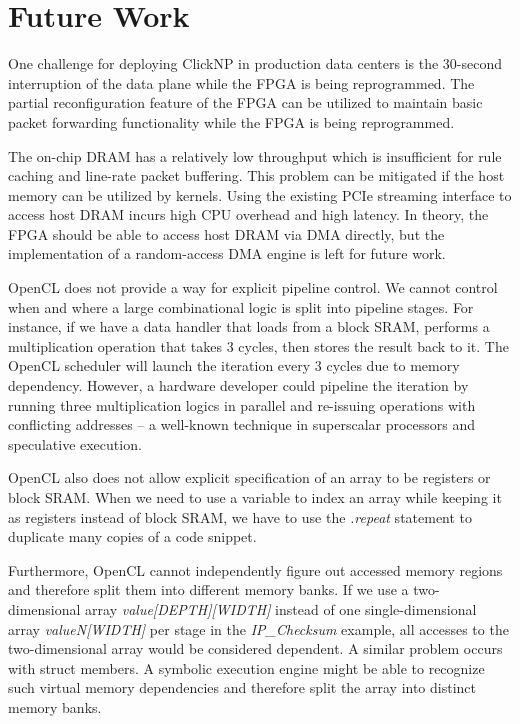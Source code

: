 \section{Future Work}
\label{clicknp:sec:future}

One challenge for deploying ClickNP in production data centers is the 30-second interruption of the data plane while the FPGA is being reprogrammed. The partial reconfiguration \cite{bourgeault2011alteras} feature of the FPGA can be utilized to maintain basic packet forwarding functionality while the FPGA is being reprogrammed.

The on-chip DRAM has a relatively low throughput which is insufficient for rule caching and line-rate packet buffering. This problem can be mitigated if the host memory can be utilized by kernels. Using the existing PCIe streaming interface to access host DRAM incurs high CPU overhead and high latency. In theory, the FPGA should be able to access host DRAM via DMA directly, but the implementation of a random-access DMA engine is left for future work.

OpenCL does not provide a way for explicit pipeline control. We cannot control when and where a large combinational logic is split into pipeline stages. For instance, if we have a data handler that loads from a block SRAM, performs a multiplication operation that takes 3 cycles, then stores the result back to it. The OpenCL scheduler will launch the iteration every 3 cycles due to memory dependency. However, a hardware developer could pipeline the iteration by running three multiplication logics in parallel and re-issuing operations with conflicting addresses -- a well-known technique in superscalar processors and speculative execution.

OpenCL also does not allow explicit specification of an array to be registers or block SRAM. When we need to use a variable to index an array while keeping it as registers instead of block SRAM, we have to use the \textit{.repeat} statement to duplicate many copies of a code snippet.

Furthermore, OpenCL cannot independently figure out accessed memory regions and therefore split them into different memory banks. If we use a two-dimensional array \textit{value[DEPTH][WIDTH]} instead of one single-dimensional array \textit{valueN[WIDTH]} per stage in the \textit{IP\_Checksum} example, all accesses to the two-dimensional array would be considered dependent. A similar problem occurs with struct members. A symbolic execution engine might be able to recognize such virtual memory dependencies and therefore split the array into distinct memory banks.

